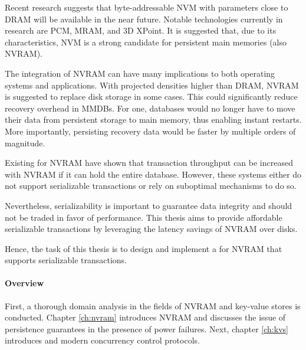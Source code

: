 Recent research suggests that byte-addressable \ac{NVM} with parameters close to
\ac{DRAM} will be available in the near future. Notable technologies currently
in research are \ac{PCM}, \ac{MRAM}, and 3D XPoint. It is suggested that, due to
its characteristics, \ac{NVM} is a strong candidate for persistent main memories
(also \ac{NVRAM}).



The integration of \ac{NVRAM} can have many implications to both operating
systems and applications. With projected densities higher than \ac{DRAM},
\ac{NVRAM} is suggested to replace disk storage in some cases. This could
significantly reduce recovery overhead in \acp{MMDB}. For one, databases would
no longer have to move their data from persistent storage to main memory, thus
enabling instant restarts. More importantly, persisting recovery data would be
faster by multiple orders of magnitude.

Existing \kvsp for \ac{NVRAM} have shown that transaction throughput can be
increased with \ac{NVRAM} if it can hold the entire database. However, these
systems either do not support serializable transactions or rely on suboptimal
mechanisms to do so.

Nevertheless, serializability is important to guarantee data integrity and
should not be traded in favor of performance. This thesis aims to provide
affordable serializable transactions by leveraging the latency savings of
\ac{NVRAM} over disks.


Hence, the task of this thesis is to design and implement a \kvs for \ac{NVRAM}
that supports serializable transactions.


\paragraph{Overview}

First, a thorough domain analysis in the fields of \ac{NVRAM} and key-value
stores is conducted. Chapter \ref{ch:nvram} introduces \ac{NVRAM} and discusses
the issue of persistence guarantees in the presence of power failures. Next,
chapter \ref{ch:kvs} introduces \kvsp and modern concurrency control protocols.

